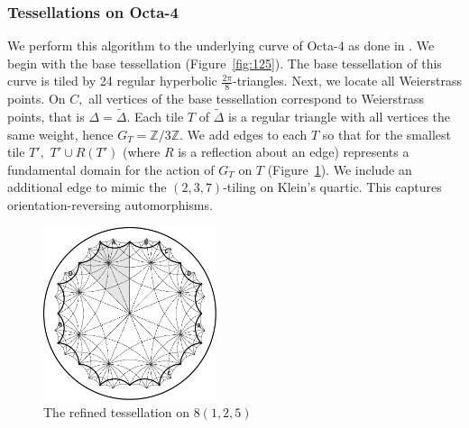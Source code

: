 \documentclass[12pt,reqno]{amsart}
\DeclareMathOperator{\Aut}{Aut}
\newcommand{\Z}{\mathbb{Z}}
\theoremstyle{definition}
\theoremstyle{remark}
\begin{document}
\subsubsection*{Tessellations on Octa-4}
We perform this algorithm to the underlying curve of Octa-4 as done in \cite{dami}. We begin with the base tessellation (Figure~\ref{fig:125}). The base tessellation of this curve is tiled by 24 regular hyperbolic $\frac{2 \pi}{8}$-triangles. Next, we locate all Weierstrass points. On $C,$ all vertices of the base tessellation correspond to Weierstrass points, that is $\Delta = \widetilde{\Delta}$. Each tile $T$ of $\widetilde{\Delta}$ is a regular triangle with all vertices the same weight, hence $G_T = \Z/ 3\Z$. We add edges to each $T$ so that for the smallest tile $T',$ $T' \cup R(T')$ (where $R$ is a reflection about an edge) represents a fundamental domain for the action of $G_T$ on $T$ (Figure~\ref{fig:125_ref}). We include an additional edge to mimic the $(2,3,7)$-tiling on Klein's quartic. This captures orientation-reversing automorphisms. 







\begin{figure}[htbp] %
   \centering
   \includegraphics[width=2in]{figures/125_hyp} 
	\caption{The refined tessellation on $8(1, 2, 5)$}
	\label{fig:125_ref}
\end{figure}
\end{document}
